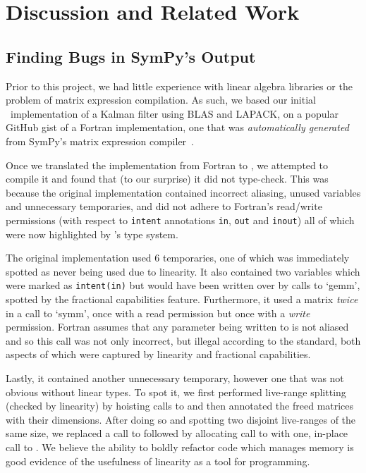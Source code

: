 \section{Discussion and Related Work}\label{sec:discussion_related_work}

\subsection{Finding Bugs in SymPy's Output}\label{subsec:finding_bugs}

Prior to this project, we had little experience with linear algebra libraries
or the problem of matrix expression compilation. As such, we based our initial
\lang\ implementation of a Kalman filter using BLAS and LAPACK, on a popular
GitHub gist of a Fortran implementation, one that was \emph{automatically
generated} from SymPy's matrix expression compiler~\cite{rocklin_thesis}.

Once we translated the implementation from Fortran to \lang, we attempted to
compile it and found that (to our surprise) it did not type-check. This was
because the original implementation contained incorrect aliasing, unused
variables and unnecessary temporaries, and did not adhere to Fortran's
read/write permissions (with respect to \texttt{intent} annotations
\texttt{in}, \texttt{out} and \texttt{inout}) all of which were now highlighted
by \lang's type system.

The original implementation used 6 temporaries, one of which was immediately
spotted as never being used due to linearity. It also contained two variables
which were marked as \texttt{intent(in)} but would have been written over by
calls to `gemm', spotted by the fractional capabilities feature. Furthermore,
it used a matrix \emph{twice} in a call to `symm', once with a read permission
but once with a \emph{write} permission.  Fortran assumes that any parameter
being written to is not aliased and so this call was not only incorrect, but
illegal according to the standard, both aspects of which were captured by
linearity and fractional capabilities.

Lastly, it contained another unnecessary temporary, however one that was not
obvious without linear types. To spot it, we first performed live-range
splitting (checked by linearity) by hoisting calls to  and then
annotated the freed matrices with their dimensions.  After doing so and
spotting two disjoint live-ranges of the same size, we replaced a call to
 followed by allocating call to  with one, in-place
call to . We believe the ability to boldly refactor code which
manages memory is good evidence of the usefulness of linearity as a tool for
programming.

